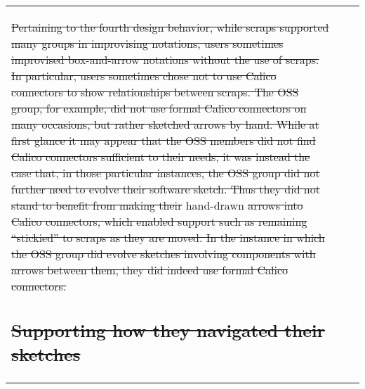 \documentclass[12pt,fleqn]{ucithesis}
\providecommand{\DIFaddtex}[1]{{\protect\color{blue}\uwave{#1}}} %
\providecommand{\DIFdeltex}[1]{{\protect\color{red}\sout{#1}}}                      %
\providecommand{\DIFaddbegin}{} %
\providecommand{\DIFaddend}{} %
\providecommand{\DIFdelbegin}{} %
\providecommand{\DIFdelend}{} %
\providecommand{\DIFadd}[1]{\texorpdfstring{\DIFaddtex{#1}}{#1}} %
\providecommand{\DIFdel}[1]{\texorpdfstring{\DIFdeltex{#1}}{}} %
\begin{document}
\begin{center}
\begin{longtable}{|p{3cm}|p{6cm}|p{6cm}|}
\DIFdelbegin \DIFdel{Pertaining to the fourth design behavior, while scraps supported many groups in improvising notations, users sometimes improvised box-and-arrow notations without the use of scraps. In particular, users sometimes chose not to use Calico connectors to show relationships between scraps. The OSS group, for example, did not use formal Calico connectors on many occasions, but rather sketched arrows by hand. While at first glance it may appear that the OSS members did not find Calico connectors sufficient to their needs, it was instead the case that, in those particular instances, the OSS group did not further need to evolve their software sketch. Thus they did not stand to benefit from making their }\DIFdelend \DIFaddbegin \DIFadd{3. Existing }\DIFaddend hand-drawn \DIFdelbegin \DIFdel{arrows into Calico connectors, which enabled support such as remaining ``stickied'' to scraps
as they are moved. In the instance in which the OSS group did evolve sketches involving components with arrows between them, they did indeed use formal Calico connectors. 
}%



\subsection{\DIFdel{Supporting how they navigated their sketches}}
\addtocounter{subsection}{-1}%


\end{longtable}
\end{center}
\end{document}
